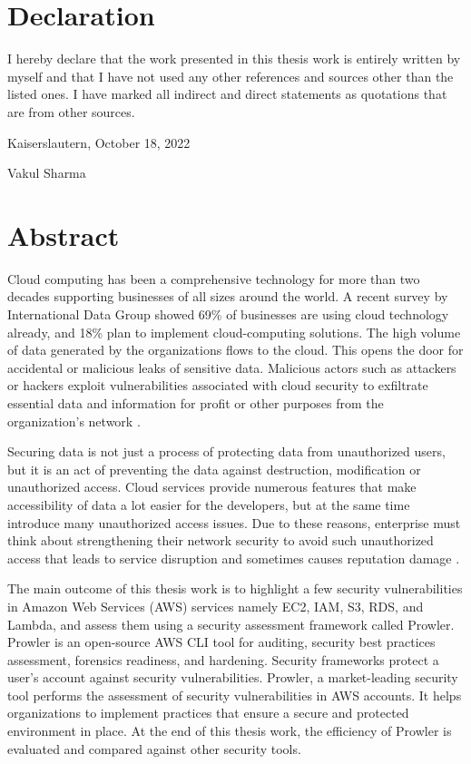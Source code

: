 \documentclass[a4paper,11pt]{report}
\begin{document}

\clearpage
\section*{Declaration}
\text
I hereby declare that the work presented in this thesis work is entirely written by myself and that I have not used any other references and sources other than the listed ones.
I have marked all indirect and direct statements as
quotations that are from other sources.\\

\raggedright{Kaiserslautern, October 18, 2022}\\

\hfill \break
\raggedright{Vakul Sharma}


\cleardoublepage

\section*{Abstract}
\text
Cloud computing has been a comprehensive technology for more
than two decades supporting
businesses of all sizes
around
the world.
A recent survey by International Data Group showed 69\%
of businesses are using cloud technology already, and 18\% plan
to implement cloud-computing solutions.
The high volume of data generated by the organizations flows to the cloud.
This opens the door for accidental or malicious leaks of sensitive data.
Malicious actors such as attackers or hackers exploit vulnerabilities associated with cloud security to exfiltrate essential data and information for profit or other purposes from the organization’s network \cite{1}.

\hfill \break

Securing data is not just a process of protecting data
from unauthorized users, but it is an act of preventing
the data against destruction, modification or
unauthorized access.
Cloud services provide numerous features that make accessibility of data a lot easier for the developers, but at the same time introduce many unauthorized access issues.
Due to these reasons, enterprise must think
about strengthening
their network security to avoid such unauthorized access that leads to service disruption and sometimes causes reputation damage \cite{1}.

\hfill \break
The main outcome of this thesis work is to highlight a few security vulnerabilities in Amazon Web Services (AWS) services namely EC2, IAM, S3, RDS, and Lambda, and assess them using a security assessment framework called Prowler.
Prowler is an open-source AWS CLI tool for auditing, security best practices assessment, forensics readiness, and hardening.
Security frameworks protect a user’s account against security vulnerabilities.
Prowler, a market-leading security tool performs the assessment of security vulnerabilities in AWS accounts.
It helps organizations to implement practices that ensure a secure and protected environment in place.
At the end of this thesis work, the efficiency of Prowler is evaluated and compared against other security tools.
\end{document}
